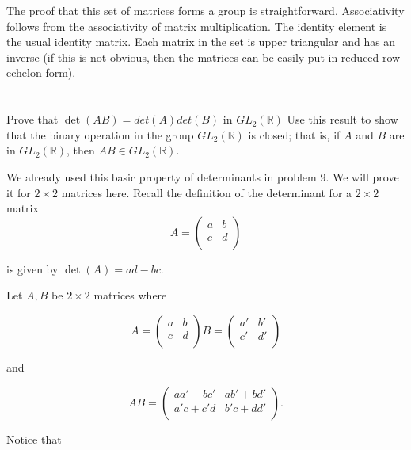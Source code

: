\documentclass[a4paper]{article}
\begin{document}
The proof that this set of matrices forms a group is straightforward. Associativity follows from the associativity of matrix multiplication. The identity element is the usual identity matrix. Each matrix in the set is upper triangular and has an inverse (if this is not obvious, then the matrices can be easily put in reduced row echelon form).


\section{}

Prove that $\det(AB) = det(A)det(B)$ in $GL_2(\mathbb{R})$ Use this result to show that the binary operation in the group $GL_2(\mathbb{R})$ is closed; that is, if $A$ and $B$ are in $GL_2(\mathbb{R})$, then $AB \in GL_2(\mathbb{R})$.

\vspace{\baselineskip}

We already used this basic property of determinants in problem 9. We will prove it for $2 \times 2$ matrices here. Recall the definition of the determinant for a $2 \times 2$ matrix 
$$A = 
  \begin{pmatrix}
    a & b \\
    c & d \\
  \end{pmatrix}
$$
  
is given by $\det(A) = ad - bc$.

\vspace{\baselineskip}

Let $A,B$ be $2 \times 2$ matrices where  

$$A = 
  \begin{pmatrix}
    a & b \\
    c & d \\
  \end{pmatrix}
  B = 
  \begin{pmatrix}
    a' & b' \\
    c' & d' \\
  \end{pmatrix}
$$

and 

$$AB = 
  \begin{pmatrix}
    aa' + bc' & ab' + bd'\\
    a'c + c'd & b'c + dd' \\
  \end{pmatrix}.
$$

Notice that 
\end{document}
